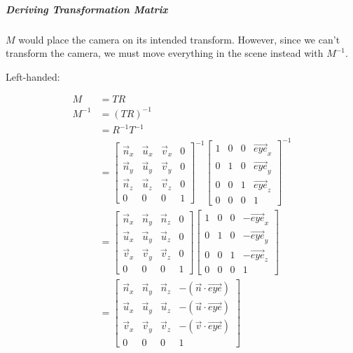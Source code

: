   \subparagraph{Deriving Transformation Matrix}
  $ M $ would place the camera on its intended transform. However, since
  we can't transform the camera, we must move everything in the scene instead
  with $ M^{-1} $.

  Left-handed:

  \begin{align}
    M &= T R \\
    M^{-1} &= \left( T R \right)^{-1} \\
    &= R^{-1} T^{-1} \\
    &=
    \begin{bmatrix}
      \vec{n}_{x} & \vec{u}_{x} & \vec{v}_{x} & 0 \\
      \vec{n}_{y} & \vec{u}_{y} & \vec{v}_{y} & 0 \\
      \vec{n}_{z} & \vec{u}_{z} & \vec{v}_{z} & 0 \\
      0 & 0 & 0 & 1
    \end{bmatrix}^{-1}
    \begin{bmatrix}
      1 & 0 & 0 & \vec{eye}_{x} \\
      0 & 1 & 0 & \vec{eye}_{y} \\
      0 & 0 & 1 & \vec{eye}_{z} \\
      0 & 0 & 0 & 1
    \end{bmatrix}^{-1} \\
    &=
    \begin{bmatrix}
      \vec{n}_{x} & \vec{n}_{y} & \vec{n}_{z} & 0 \\
      \vec{u}_{x} & \vec{u}_{y} & \vec{u}_{z} & 0 \\
      \vec{v}_{x} & \vec{v}_{y} & \vec{v}_{z} & 0 \\
      0 & 0 & 0 & 1
    \end{bmatrix}
    \begin{bmatrix}
      1 & 0 & 0 & -\vec{eye}_{x} \\
      0 & 1 & 0 & -\vec{eye}_{y} \\
      0 & 0 & 1 & -\vec{eye}_{z} \\
      0 & 0 & 0 & 1
    \end{bmatrix} \\
    &=
    \begin{bmatrix}
      \vec{n}_{x} & \vec{n}_{y} & \vec{n}_{z} & -\left( \vec{n} \cdot \vec{eye} \right) \\
      \vec{u}_{x} & \vec{u}_{y} & \vec{u}_{z} & -\left( \vec{u} \cdot \vec{eye} \right) \\
      \vec{v}_{x} & \vec{v}_{y} & \vec{v}_{z} & -\left( \vec{v} \cdot \vec{eye} \right) \\
      0 & 0 & 0 & 1
    \end{bmatrix}
  \end{align}

